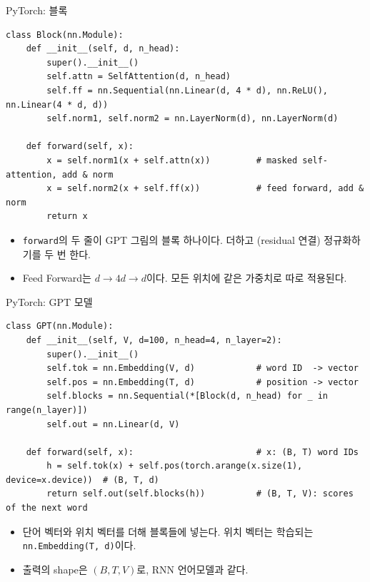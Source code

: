 \documentclass[aspectratio=169,11pt]{beamer}
\begin{document}
\begin{frame}[fragile]{PyTorch: 블록}
\begin{lstlisting}
class Block(nn.Module):
    def __init__(self, d, n_head):
        super().__init__()
        self.attn = SelfAttention(d, n_head)
        self.ff = nn.Sequential(nn.Linear(d, 4 * d), nn.ReLU(), nn.Linear(4 * d, d))
        self.norm1, self.norm2 = nn.LayerNorm(d), nn.LayerNorm(d)

    def forward(self, x):
        x = self.norm1(x + self.attn(x))         # masked self-attention, add & norm
        x = self.norm2(x + self.ff(x))           # feed forward, add & norm
        return x
\end{lstlisting}
\begin{itemize}
\item \texttt{forward}의 두 줄이 GPT 그림의 블록 하나이다.
  더하고 (residual 연결) 정규화하기를 두 번 한다.
\item Feed Forward는 $d\to4d\to d$이다. 모든 위치에 같은 가중치로 따로 적용된다.
\end{itemize}
\end{frame}

\begin{frame}[fragile]{PyTorch: GPT 모델}
\begin{lstlisting}
class GPT(nn.Module):
    def __init__(self, V, d=100, n_head=4, n_layer=2):
        super().__init__()
        self.tok = nn.Embedding(V, d)            # word ID  -> vector
        self.pos = nn.Embedding(T, d)            # position -> vector
        self.blocks = nn.Sequential(*[Block(d, n_head) for _ in range(n_layer)])
        self.out = nn.Linear(d, V)

    def forward(self, x):                        # x: (B, T) word IDs
        h = self.tok(x) + self.pos(torch.arange(x.size(1), device=x.device))  # (B, T, d)
        return self.out(self.blocks(h))          # (B, T, V): scores of the next word
\end{lstlisting}
\begin{itemize}
\item 단어 벡터와 위치 벡터를 더해 블록들에 넣는다.
  위치 벡터는 학습되는 \texttt{nn.Embedding(T, d)}이다.
\item 출력의 shape은 $(B,T,V)$로, RNN 언어모델과 같다.
\end{itemize}
\end{frame}
\end{document}
